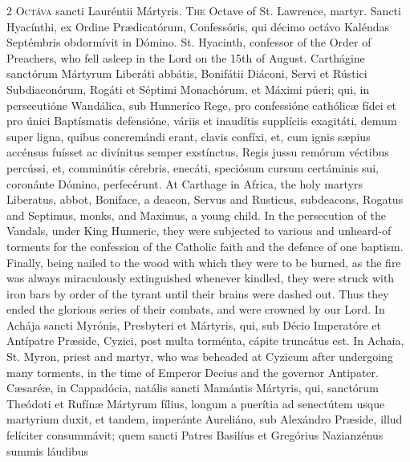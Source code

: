 \begin{paracol}{2}
\lettrine[lines=1]{O}{ctáva} sancti Lauréntii 
 Mártyris.
\switchcolumn
{}
\lettrine[lines=1]{T}{he} Octave of St. Lawrence, martyr.
\switchcolumn*
{}
Sancti Hyacínthi, ex 
 Ordine Prædicatórum, Confessóris, qui décimo octávo Kaléndas Septémbris 
 obdormívit in Dómino.
\switchcolumn
{}
St. Hyacinth, confessor of the Order 
 of Preachers, who fell asleep in the Lord on the 15th of August.
\switchcolumn*
{}
Carthágine sanctórum 
 Mártyrum Liberáti abbátis, Bonifátii Diáconi, Servi et Rústici Subdiaconórum, 
 Rogáti et Séptimi Monachórum, et Máximi púeri; qui, in persecutióne 
 Wandálica, sub Hunneríco Rege, pro confessióne cathólicæ fídei et pro únici 
 Baptísmatis defensióne, váriis et inaudítis supplíciis exagitáti, demum 
 super ligna, quibus concremándi erant, clavis confíxi, et, cum ignis sæpius 
 accénsus fuísset ac divínitus semper exstínctus, Regis jussu remórum 
 véctibus percússi, et, comminútis cérebris, enecáti, speciósum cursum 
 certáminis sui, coronánte Dómino, perfecérunt.
\switchcolumn
{}
At Carthage in Africa, the holy 
 martyrs Liberatus, abbot, Boniface, a deacon, Servus and Rusticus, 
 subdeacons, Rogatus and Septimus, monks, and Maximus, a young child. 
 In the persecution of the Vandals, under King Hunneric, they were subjected 
 to various and unheard-of torments for the confession of the Catholic faith 
 and the defence of one baptism. Finally, being nailed to the wood with 
 which they were to be burned, as the fire was always miraculously 
 extinguished whenever kindled, they were struck with iron bars by order of 
 the tyrant until their brains were dashed out. Thus they ended the 
 glorious series of their combats, and were crowned by our Lord.
\switchcolumn*
{}
In Achája sancti 
 Myrónis, Presbyteri et Mártyris, qui, sub Décio Imperatóre et Antípatre 
 Præside, Cyzici, post multa torménta, cápite truncátus est.
\switchcolumn
{}
In Achaia, St. Myron, priest and 
 martyr, who was beheaded at Cyzicum after undergoing many torments, in the 
 time of Emperor Decius and the governor Antipater.
\switchcolumn*
{}
Cæsaréæ, in Cappadócia, natális sancti Mamántis Mártyris, qui, sanctórum Theódoti et Rufínæ Mártyrum 
 fílius, longum a puerítia ad senectútem usque martyrium duxit, et tandem, 
 imperánte Aureliáno, sub Alexándro Præside, illud felíciter consummávit; 
 quem sancti Patres Basilíus et Gregórius Nazianzénus summis láudibus 

\end{paracol}
